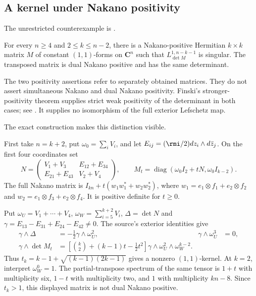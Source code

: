 \subsection{A kernel under Nakano positivity}
\label{sec:appH-Nakano-unrestricted}

The unrestricted counterexample is
\cite[Theorem~A and \S3]{Chen26NakanoDeterminantsV2}.

\begin{theorem}
\label{thm:appH-Nakano-Lefschetz-failure}
For every $n\geq4$ and $2\leq k\leq n-2$, there is a
Nakano-positive Hermitian $k\times k$ matrix $M$ of constant
$(1,1)$-forms on $\mathbf C^n$ such that
$L^{1,n-k-1}_{\det M}$ is singular. The transposed matrix is
dual Nakano positive and has the same determinant.
\end{theorem}

The two positivity assertions refer to separately obtained
matrices. They do not assert simultaneous Nakano and dual
Nakano positivity. Finski's stronger-positivity theorem supplies
strict weak positivity of the determinant in both cases;
see \cite[Theorem~1.1]{Finski22CharacteristicPublished}.
It supplies no isomorphism of the full exterior Lefschetz map.

The exact construction makes this distinction visible.

\begin{example}
\label{ex:appH-Nakano-explicit-kernel}
First take $n=k+2$, put $\omega_0=\sum_iV_i$, and let
$E_{ij}=(\rmi/2)dz_i\wedge d\bar z_j$. On the first four
coordinates set
\begin{equation*}
 N=\begin{pmatrix}
 V_1+V_3&E_{12}+E_{34}\\
 E_{21}+E_{43}&V_2+V_4
 \end{pmatrix},\qquad
 M_t=\operatorname{diag}(\omega_0I_2+tN,\omega_0I_{k-2}).
 \tag{H.89}\label{eq:appH-Nakano-seed-matrix}
\end{equation*}
The full Nakano matrix is
$I_{kn}+t(w_1w_1^*+w_2w_2^*)$, where
$w_1=e_1\otimes f_1+e_2\otimes f_2$ and
$w_2=e_1\otimes f_3+e_2\otimes f_4$. It is positive
definite for $t\geq0$.

Put $\omega_U=V_1+\cdots+V_4$,
$\omega_W=\sum_{i=5}^{k+2}V_i$, $\Delta=\det N$ and
$\gamma=E_{13}-E_{31}+E_{24}-E_{42}\ne0$.
The source's exterior identities give
\begin{equation*}
 \begin{aligned}
 \gamma\wedge\Delta&=-\tfrac12\gamma\wedge\omega_U^2,
 &\gamma\wedge\omega_U^3&=0,\\
 \gamma\wedge\det M_t
   &=\left[\binom{k}{2}+(k-1)t-\tfrac12t^2\right]
       \gamma\wedge\omega_U^2\wedge\omega_W^{k-2}.
 \end{aligned}
 \tag{H.90}\label{eq:appH-Nakano-kernel-polynomial}
\end{equation*}
Thus $t_k=k-1+\sqrt{(k-1)(2k-1)}$ gives a nonzero
$(1,1)$-kernel. At $k=2$, interpret $\omega_W^0=1$.
The partial-transpose spectrum of the same tensor is
$1+t$ with multiplicity six, $1-t$ with multiplicity two,
and $1$ with multiplicity $kn-8$. Since $t_k>1$, this
displayed matrix is not dual Nakano positive.
\end{example}

